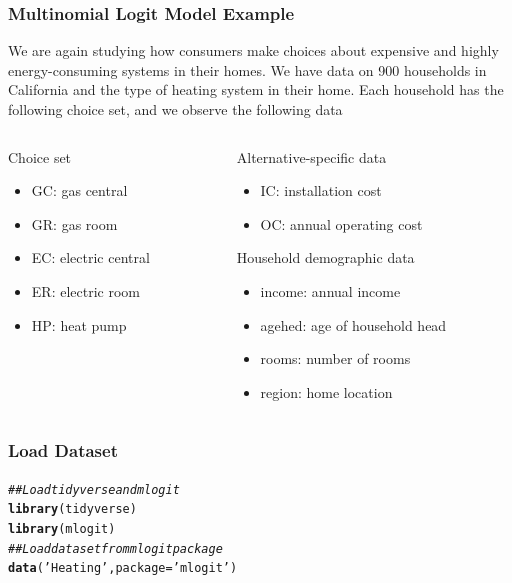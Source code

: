 \documentclass{beamer}\usepackage[]{graphicx}\usepackage[]{color}
\makeatletter
\newcommand{\hlstr}[1]{\textcolor[rgb]{0.192,0.494,0.8}{#1}}%
\newcommand{\hlcom}[1]{\textcolor[rgb]{0.678,0.584,0.686}{\textit{#1}}}%
\newcommand{\hlstd}[1]{\textcolor[rgb]{0.345,0.345,0.345}{#1}}%
\newcommand{\hlkwc}[1]{\textcolor[rgb]{0.333,0.667,0.333}{#1}}%
\newcommand{\hlkwd}[1]{\textcolor[rgb]{0.737,0.353,0.396}{\textbf{#1}}}%
\newenvironment{kframe}{%
 \def\at@end@of@kframe{}%
 \ifinner\ifhmode%
  \def\at@end@of@kframe{\end{minipage}}%
  \begin{minipage}{\columnwidth}%
 \fi\fi%
 \def\FrameCommand##1{\hskip\@totalleftmargin \hskip-\fboxsep
 \colorbox{shadecolor}{##1}\hskip-\fboxsep
     \hskip-\linewidth \hskip-\@totalleftmargin \hskip\columnwidth}%
 \MakeFramed {\advance\hsize-\width
   \@totalleftmargin\z@ \linewidth\hsize
   \@setminipage}}%
 {\par\unskip\endMakeFramed%
 \at@end@of@kframe}
\newenvironment{knitrout}{}{} %
\makeatother
\begin{document}
\begin{frame}\frametitle{Multinomial Logit Model Example}
    We are again studying how consumers make choices about expensive and highly energy-consuming systems in their homes. We have data on 900 households in California and the type of heating system in their home. Each household has the following choice set, and we observe the following data \\
    \vspace{3ex}
    \begin{columns}
    	\begin{column}{0.5\textwidth}
		    Choice set
		    \begin{itemize}
		    	\item GC: gas central
		    	\item GR: gas room
		    	\item EC: electric central
		    	\item ER: electric room
		    	\item HP: heat pump
		    \end{itemize}
		    \vspace{8ex}
	    \end{column}
	    \begin{column}{0.5\textwidth}
		    Alternative-specific data
		    \begin{itemize}
		    	\item IC: installation cost
		    	\item OC: annual operating cost
		    \end{itemize}
		    \vspace{2ex}
		    Household demographic data
		    \begin{itemize}
		    	\item income: annual income
		    	\item agehed: age of household head
		    	\item rooms: number of rooms
		    	\item region: home location
		    \end{itemize}
		\end{column}
    \end{columns}
\end{frame}

\begin{frame}[fragile]\frametitle{Load Dataset}
\begin{knitrout}\footnotesize
{}\color{fgcolor}\begin{kframe}
\begin{alltt}
\hlcom{## Load tidyverse and mlogit}
\hlkwd{library}\hlstd{(tidyverse)}
\hlkwd{library}\hlstd{(mlogit)}
\hlcom{## Load dataset from mlogit package}
\hlkwd{data}\hlstd{(}\hlstr{'Heating'}\hlstd{,} \hlkwc{package} \hlstd{=} \hlstr{'mlogit'}\hlstd{)}
\end{alltt}
\end{kframe}
\end{knitrout}
\end{frame}
\end{document}
